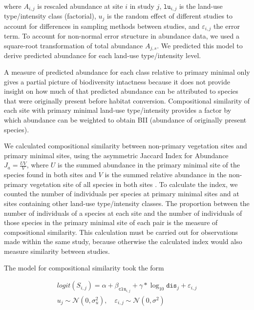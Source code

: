 \documentclass[titlesmallcaps,copyrightpage]{uomthesis}\usepackage[]{graphicx}\usepackage[]{color}
\begin{document}
 where \(A_{i, j}\) is rescaled abundance at site \(i\) in study \(j\), \(\texttt{lu}_{i, j}\) is the land-use type/intensity class (factorial), \(u_{j}\) is the random effect of different studies to account for differences in sampling methods between studies, and \(\varepsilon_{i,j}\) the error term. To account for non-normal error structure in abundance data, we used a square-root transformation of total abundance \(A_{j,s}\). We predicted this model to derive predicted abundance for each land-use type/intensity level.

A measure of predicted abundance for each class relative to primary minimal only gives a partial picture of biodiversity intactness because it does not provide insight on how much of that predicted abundance can be attributed to species that were originally present before habitat conversion. Compositional similarity of each site with primary minimal land-use type/intensity provides a factor by which abundance can be weighted to obtain BII (abundance of originally present species).

We calculated compositional similarity between non-primary vegetation sites and primary minimal sites, using the asymmetric Jaccard Index for Abundance \(J_a = \frac{UV}{V}\), where \(U\) is the summed abundance in the primary minimal site of the species found in both sites and \(V\) is the summed relative abundance in the non-primary vegetation site of all species in both sites \citep{newbold_has_2016, kunin_towards_1995}. To calculate the index, we counted the number of individuals per species at primary minimal sites and at sites containing other land-use type/intensity classes. The proportion between the number of individuals of a species at each site and the number of individuals of those species in the primary minimal site of each pair is the measure of compositional similarity. This calculation must be carried out for observations made within the same study, because otherwise the calculated index would also measure similarity between studies.

The model for compositional similarity took the form

 \begin{equation}
\begin{aligned}
logit(S_{i, j}) = \alpha + \beta_{\texttt{clu}_{i, j}} + \gamma * \log_{10} \texttt{dis}_{j} + \varepsilon_{i,j} \\
u_{j} \sim \mathcal N(0, \sigma_u^2), \quad \varepsilon_{i,j} \sim \mathcal N(0, \sigma^2)
\end{aligned}
\end{equation}
\end{document}
